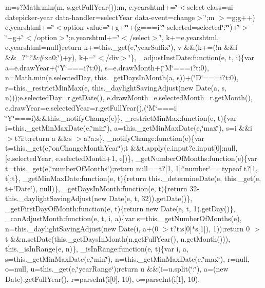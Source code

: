 {{\begin{DoxyParamCaption}
m=s?\+Math.\+min(m, s.\+get\+Full\+Year())\+:m, e.\+yearshtml+=\char`\"{}$<$select class=\textquotesingle{}ui-\/datepicker-\/year\textquotesingle{} data-\/handler=\textquotesingle{}select\+Year\textquotesingle{} data-\/event=\textquotesingle{}change\textquotesingle{}$>$\char`\"{};m $>$=g;g++) e.\+yearshtml+=\char`\"{}$<$option value=\textquotesingle{}\char`\"{}+g+\char`\"{}\textquotesingle{}\char`\"{}+(g===i?\char`\"{} selected=\textquotesingle{}selected\textquotesingle{}\char`\"{}\+:\char`\"{}\char`\"{})+\char`\"{}$>$\char`\"{}+g+\char`\"{}$<$/option$>$\char`\"{};e.\+yearshtml+=\char`\"{}$<$/select$>$\char`\"{}, k+=e.\+yearshtml, e.\+yearshtml=null\}return k+=this.\+\_\+get(e,\char`\"{}year\+Suffix\char`\"{}), v \&\&(k+=(!n \&\&f \&\&\+\_\+?\char`\"{}\char`\"{}\+:\char`\"{}\&\#xa0;\char`\"{})+y), k+=\char`\"{}$<$/div$>$\char`\"{}\}, \+\_\+adjust\+Inst\+Date\+:function(e, t, i)\{var a=e.\+draw\+Year+(\char`\"{}\+Y\char`\"{}===i?t\+:0), s=e.\+draw\+Month+(\char`\"{}\+M\char`\"{}===i?t\+:0), n=\+Math.\+min(e.\+selected\+Day, this.\+\_\+get\+Days\+In\+Month(a, s))+(\char`\"{}\+D\char`\"{}===i?t\+:0), r=this.\+\_\+restrict\+Min\+Max(e, this.\+\_\+daylight\+Saving\+Adjust(new Date(a, s, n)));e.\+selected\+Day=r.\+get\+Date(), e.\+draw\+Month=e.\+selected\+Month=r.\+get\+Month(), e.\+draw\+Year=e.\+selected\+Year=r.\+get\+Full\+Year(),(\char`\"{}\+M\char`\"{}===i$\vert$$\vert$\char`\"{}\+Y\char`\"{}===i)\&\&this.\+\_\+notify\+Change(e)\}, \+\_\+restrict\+Min\+Max\+:function(e, t)\{var i=this.\+\_\+get\+Min\+Max\+Date(e,\char`\"{}min\char`\"{}), a=this.\+\_\+get\+Min\+Max\+Date(e,\char`\"{}max\char`\"{}), s=i \&\&i $>$t?i\+:t;return a \&\&s $>$a?a\+:s\}, \+\_\+notify\+Change\+:function(e)\{var t=this.\+\_\+get(e,\char`\"{}on\+Change\+Month\+Year\char`\"{});t \&\&t.\+apply(e.\+input?e.\+input\mbox{[}0\mbox{]}\+:null,\mbox{[}e.\+selected\+Year, e.\+selected\+Month+1, e\mbox{]})\}, \+\_\+get\+Number\+Of\+Months\+:function(e)\{var t=this.\+\_\+get(e,\char`\"{}number\+Of\+Months\char`\"{});return null==t?\mbox{[}1, 1\mbox{]}\+:\char`\"{}number\char`\"{}==typeof t?\mbox{[}1, t\mbox{]}\+:t\}, \+\_\+get\+Min\+Max\+Date\+:function(e, t)\{return this.\+\_\+determine\+Date(e, this.\+\_\+get(e, t+\char`\"{}\+Date\char`\"{}), null)\}, \+\_\+get\+Days\+In\+Month\+:function(e, t)\{return 32-\/this.\+\_\+daylight\+Saving\+Adjust(new Date(e, t, 32)).\+get\+Date()\}, \+\_\+get\+First\+Day\+Of\+Month\+:function(e, t)\{return new Date(e, t, 1).\+get\+Day()\}, \+\_\+can\+Adjust\+Month\+:function(e, t, i, a)\{var s=this.\+\_\+get\+Number\+Of\+Months(e), n=this.\+\_\+daylight\+Saving\+Adjust(new Date(i, a+(0 $>$t?t\+:s\mbox{[}0\mbox{]}$\ast$s\mbox{[}1\mbox{]}), 1));return 0 $>$t \&\&n.\+set\+Date(this.\+\_\+get\+Days\+In\+Month(n.\+get\+Full\+Year(), n.\+get\+Month())), this.\+\_\+is\+In\+Range(e, n)\}, \+\_\+is\+In\+Range\+:function(e, t)\{var i, a, s=this.\+\_\+get\+Min\+Max\+Date(e,\char`\"{}min\char`\"{}), n=this.\+\_\+get\+Min\+Max\+Date(e,\char`\"{}max\char`\"{}), r=null, o=null, u=this.\+\_\+get(e,\char`\"{}year\+Range\char`\"{});return u \&\&(i=u.\+split(\char`\"{}\+:\char`\"{}), a=(new Date).\+get\+Full\+Year(), r=parse\+Int(i\mbox{[}0\mbox{]}, 10), o=parse\+Int(i\mbox{[}1\mbox{]}, 10), 
\end{DoxyParamCaption}}}
